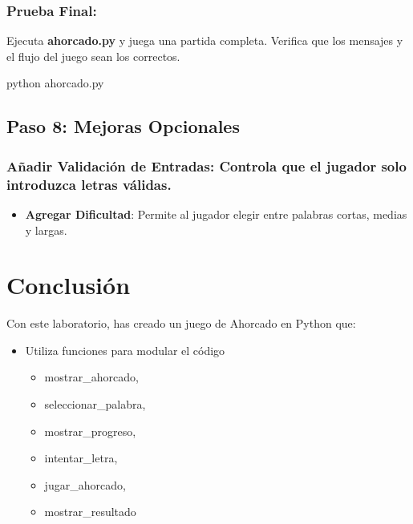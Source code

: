 \documentclass[
  a4paper,
  DIV=11,
  numbers=noendperiod,
  onepage,
  openany]{scrreprt}
\newenvironment{Shaded}{\begin{snugshade}}{\end{snugshade}}
\newcommand{\ExtensionTok}[1]{\textcolor[rgb]{0.00,0.23,0.31}{#1}}
\newcommand{\NormalTok}[1]{\textcolor[rgb]{0.00,0.23,0.31}{#1}}
\providecommand{\tightlist}{%
  \setlength{\itemsep}{0pt}\setlength{\parskip}{0pt}}\usepackage{longtable,booktabs,array}
\begin{document}
\subsection{Prueba Final:}\label{prueba-final}

Ejecuta \textbf{ahorcado.py} y juega una partida completa. Verifica que
los mensajes y el flujo del juego sean los correctos.

\begin{Shaded}
\begin{Highlighting}[]
\ExtensionTok{python}\NormalTok{ ahorcado.py}
\end{Highlighting}
\end{Shaded}

\section{Paso 8: Mejoras Opcionales}\label{paso-8-mejoras-opcionales}

\subsection{Añadir Validación de Entradas: Controla que el jugador solo
introduzca letras
válidas.}\label{auxf1adir-validaciuxf3n-de-entradas-controla-que-el-jugador-solo-introduzca-letras-vuxe1lidas.}

\begin{itemize}
\tightlist
\item
  \textbf{Agregar Dificultad}: Permite al jugador elegir entre palabras
  cortas, medias y largas.
\end{itemize}

\chapter{Conclusión}\label{conclusiuxf3n-4}

Con este laboratorio, has creado un juego de Ahorcado en Python que:

\begin{itemize}
\item
  Utiliza funciones para modular el código

  \begin{itemize}
  \tightlist
  \item
    mostrar\_ahorcado,
  \item
    seleccionar\_palabra,
  \item
    mostrar\_progreso,
  \item
    intentar\_letra,
  \item
    jugar\_ahorcado,
  \item
    mostrar\_resultado
  \end{itemize}
\end{itemize}
\end{document}
